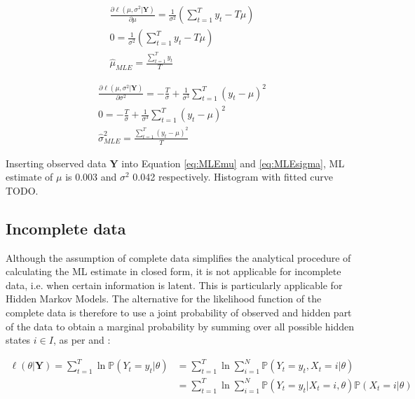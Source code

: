 \begin{gather} 
\frac{\partial \ell(\mu,\sigma^2|\textbf{Y})}{\partial \mu}  = \frac{1}{\sigma^2} (\sum_{t=1}^{T} y_t - T\mu) \nonumber \\
0 = \frac{1}{\sigma^2} (\sum_{t=1}^{T} y_t - T\mu) \nonumber\\
\hat{\mu}_{MLE} = \frac{\sum_{t=1}^{T} y_t}{T} \label{eq:MLEmu}
\end{gather}

\begin{gather} 
\frac{\partial \ell(\mu,\sigma^2|\textbf{Y})}{\partial \sigma^2}  = -\frac{T}{\sigma}+ \frac{1}{\sigma^3} \sum_{t=1}^{T} {(y_t - \mu)}^2 \nonumber\\
0 = -\frac{T}{\sigma}+ \frac{1}{\sigma^3} \sum_{t=1}^{T} {(y_t - \mu)}^2 \nonumber\\
\hat{\sigma}_{MLE}^2 = \frac{\sum_{t=1}^{T} {(y_t - \mu)}^2}{T} \label{eq:MLEsigma} 
\end{gather}

Inserting observed data $\textbf{Y}$ into Equation \ref{eq:MLEmu} and \ref{eq:MLEsigma}, ML estimate of $\mu$ is 0.003 and $\sigma^2$ 
0.042 respectively. Histogram with fitted curve TODO.

\subsection*{Incomplete data}

Although the assumption of complete data simplifies the analytical procedure of calculating the ML estimate in closed form, 
it is not applicable for incomplete data, i.e. when certain information is latent. This is particularly applicable for Hidden Markov Models. 
The alternative for the likelihood function of the complete data is therefore to use a joint probability of observed and hidden part of the data to 
obtain a marginal probability by summing over all possible hidden states $i \in I$, as per \citep{Jurafsky2008} and \citep{Devavrat2014}:

\begin{align} \label{eq:loglike}
\ell(\theta|\textbf{Y}) = \sum_{t=1}^{T} \ln \mathbb{P}(Y_t= y_t|\theta) & = \sum_{t=1}^{T} \ln \sum\limits_{i=1}^N \mathbb{P}(Y_t= y_t,X_t=i|\theta) \\
 & = \sum_{t=1}^{T} \ln \sum\limits_{i=1}^N \mathbb{P}(Y_t= y_t|X_t=i,\theta) \mathbb{P}(X_t=i|\theta) \nonumber \\
\end{align}

